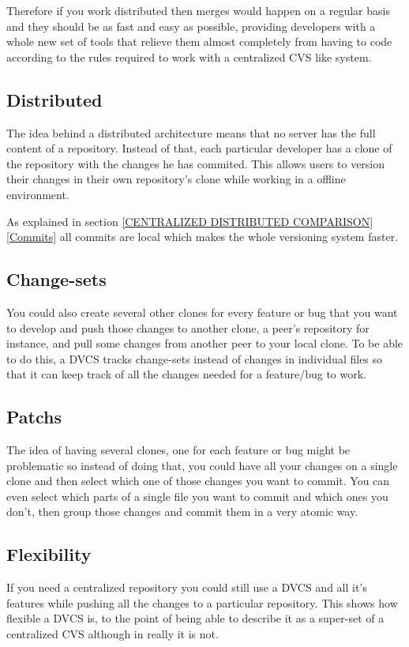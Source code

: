 \documentclass[a4paper,10pt]{article}
\newcommand{\sectionReference}[1]{\hspace{-.25em}\ref{#1}\hspace{.5em}}
\begin{document}
Therefore if you work distributed then merges would happen on a regular basis and they should be as fast and easy as possible, providing developers with a whole new set of tools that relieve them almost completely from having to code according to the rules required to work with a centralized CVS like system. 
\subsection{Distributed}
The idea behind a distributed architecture means that no server has the full content of a repository. Instead of that, each 
particular developer has a clone of the repository with the changes he has commited. 
This allows users to version their changes in their own repository's clone while working in a offline environment.

As explained in section \sectionReference{CENTRALIZED DISTRIBUTED COMPARISON}  \sectionReference{Commits} all commits are local which makes the whole versioning system faster.



\subsection{Change-sets}
You could also create several other clones for every feature or bug that you want to develop and push those changes to another clone, a peer's repository for instance, and pull some changes from another peer to your local clone. To be able to do this, a DVCS tracks change-sets instead of changes in individual files so that it can keep track of all the changes needed for a feature/bug to work.

\subsection{Patchs}
The idea of having several clones, one for each feature or bug might be problematic so instead of doing that, you could have all your changes on a single clone and then select which one of those changes you want to commit. You can even select which parts of a single file you want to commit and which ones you don't, then group those changes and commit them in a very atomic way.

%
\subsection{Flexibility}
If you need a centralized repository you could still use a DVCS and all it's features while pushing all the changes to a particular repository. This shows how flexible a DVCS is, to the point of being able to describe it as a super-set of a centralized CVS although in really it is not.
\end{document}
